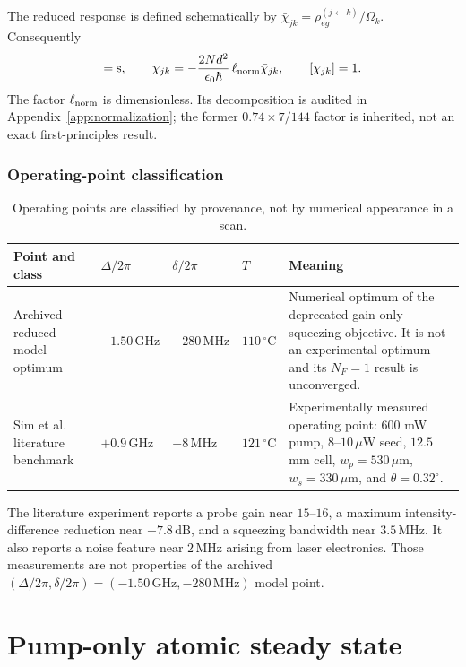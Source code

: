 \documentclass[11pt,a4paper]{article}
\newcommand{\GHz}{\,\mathrm{GHz}}
\newcommand{\MHz}{\,\mathrm{MHz}}
\newcommand{\dB}{\,\mathrm{dB}}
\newcommand{\degC}{\,^{\circ}\mathrm C}
\newcommand{\chibar}{\bar\chi}
\begin{document}
The reduced response is defined schematically by
$\chibar_{jk}=\rho_{eg}^{(j\leftarrow k)}/\Omega_k$. Consequently
\begin{equation}
[\chibar_{jk}]={\rm s},\qquad
\chi_{jk}=-\frac{2Nd^2}{\epsilon_0\hbar}\,\ell_{\rm norm}\chibar_{jk},
\qquad [\chi_{jk}]=1 .
\label{eq:susceptibility-dimension}
\end{equation}
The factor $\ell_{\rm norm}$ is dimensionless. Its decomposition is audited
in Appendix~\ref{app:normalization}; the former
$0.74\times7/144$ factor is inherited, not an exact first-principles result.

\section{Operating-point classification}

\begin{table}[ht]
\centering
\caption{Operating points are classified by provenance, not by numerical
appearance in a scan.}
\label{tab:operating-points}
\small
\begin{tabularx}{\textwidth}{L{3.2cm}C{2.0cm}C{2.0cm}C{1.7cm}Y}
\toprule
Point and class & $\Delta/2\pi$ & $\delta/2\pi$ & $T$ & Meaning\\
\midrule
Archived reduced-model optimum &
$-1.50\GHz$ & $-280\MHz$ & $110\degC$ &
Numerical optimum of the deprecated gain-only squeezing objective.
It is not an experimental optimum and its $N_F=1$ result is unconverged.\\
Sim et al. literature benchmark \cite{Sim2025} &
$+0.9\GHz$ & $-8\MHz$ & $121\degC$ &
Experimentally measured operating point: $600$ mW pump, $8$--$10\,\mu$W
seed, $12.5$ mm cell, $w_p=530\,\mu$m, $w_s=330\,\mu$m, and
$\theta=0.32^\circ$.\\
\bottomrule
\end{tabularx}
\end{table}

The literature experiment reports a probe gain near $15$--$16$, a maximum
intensity-difference reduction near $-7.8\dB$, and a squeezing bandwidth near
$3.5\MHz$. It also reports a noise feature near $2\MHz$ arising from laser
electronics. Those measurements are not properties of the archived
$(\Delta/2\pi,\delta/2\pi)=(-1.50\GHz,-280\MHz)$ model point.

\part{Pump-only atomic steady state}
\end{document}

